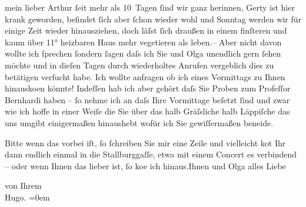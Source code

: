 \pstart{}mein lieber Arthur\pend\vspace{0.5em}
\pstart
           ſeit mehr als 10 Tagen{ }ſind wir ganz herinnen, Gerty ist hier krank geworden, befindet{ }ſich aber{ }ſchon wieder wohl und
                  Sonntag werden wir für einige Zeit wieder hinausziehen, doch läſst{ }ſich draußen in einem finſteren und kaum über {\pb}11° heizbaren Haus mehr vegetieren als leben.\hspace*{1.5em}– Aber nicht davon wollte ich{ }ſprechen{ }ſondern{ }ſagen
               daſs ich Sie und Olga unendlich gern{ }ſehen
               möchte und in dieſen Tagen durch wiederholtes Anrufen vergeblich dies zu betätigen
               verſucht habe. Ich wollte anfragen ob ich eines Vormittags zu Ihnen hinausko{\geminationm}en könnte! Indeſſen hab ich aber gehört daſs Sie {\pb}Proben zum Profeſſor Bernhardi haben –{ }ſo nehme ich an daſs Ihre Vormittage
               beſetzt{ }ſind und zwar wie ich hoffe in einer Weiſe die Sie über das halb Gräſsliche
               halb Läppiſche das uns umgibt einigermaßen hinaushebt wofür ich Sie gewiſſermaßen
               beneide.\pend
           
\pstart
           Bitte wenn das vorbei iſt, {\pb}ſo{ }ſchreiben Sie mir eine Zeile und vielleicht ko{\geminationm}t Ihr
               dann endlich einmal in die Stallburggaſſe, etwa
               mit einem Concert es verbindend – oder wenn Ihnen das lieber ist,{ }ſo ko{\geminationm}e ich hinaus.\hspace*{1.5em}Ihnen
               und Olga alles Liebe\pend
           
\pstart
           von Ihrem{\\[\baselineskip]}\spacefill\mbox{Hugo.}\pend
           \leftskip=0em{}\endnumbering{}  \newcommand{\dateiname}{L02313}\newcommand{\titel}{Hugo von Hofmannsthal an Arthur Schnitzler, [Anfang Dezember 1918]}\newcommand{\editorInnen}{Martin Anton Müller und Gerd-Hermann Susen}
